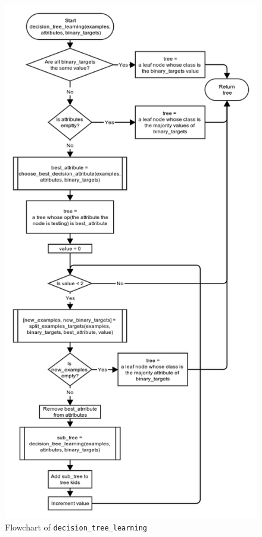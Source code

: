 \documentclass[10pt,a4paper]{article}
\begin{document}
\begin{figure}[!ht]
	\centering
	\includegraphics[scale=0.56]{images/flow_chart/id3.png}
	\caption{Flowchart of \tt{decision\_tree\_learning}}
	\label{fig:id3}
\end{figure}
\end{document}
